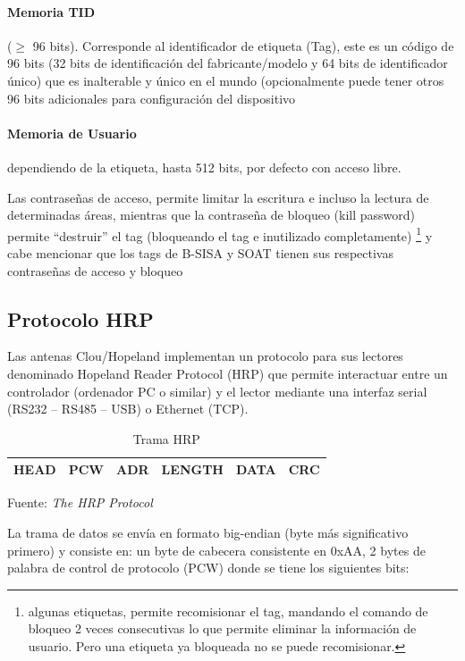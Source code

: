 \documentclass[fleqn,10pt]{SelfArx} %
\begin{document}
\paragraph{Memoria TID} ($\ge$ 96 bits). Corresponde al identificador de etiqueta (Tag), este es un código de 96 bits (32 bits de identificación del fabricante/modelo y 64 bits de identificador único) que es inalterable y único en el mundo (opcionalmente puede tener otros 96 bits adicionales para configuración del dispositivo
\paragraph{Memoria de Usuario} dependiendo de la etiqueta, hasta 512 bits, por defecto con acceso libre.

Las contraseñas de acceso, permite limitar la escritura e incluso la lectura de determinadas áreas, mientras que la contraseña de bloqueo (kill password) permite “destruir” el tag (bloqueando el tag e inutilizado completamente) \footnote{algunas etiquetas, permite recomisionar el tag, mandando el comando de bloqueo 2 veces consecutivas lo que permite eliminar la información de usuario. Pero una etiqueta ya bloqueada no se puede recomisionar.} y cabe mencionar que los tags de B-SISA y SOAT tienen sus respectivas contraseñas de acceso y bloqueo

\subsection*{Protocolo HRP}

Las antenas Clou/Hopeland implementan un protocolo para sus lectores denominado Hopeland Reader Protocol (HRP) que permite interactuar entre un controlador (ordenador PC o similar) y el lector mediante una interfaz serial (RS232 – RS485 – USB) o Ethernet (TCP).

\begin{table}[hbt]
\caption{Trama HRP}
\centering
\begin{tabular}{|l|l|l|l|l|l|}
\hline HEAD & PCW & ADR & LENGTH & DATA & CRC \\ \hline
\end{tabular}
\newline Fuente: \emph{The HRP Protocol} \cite{Hopeland:2016}
\label{tab:hrp_frame}
\end{table}

La trama de datos  se envía en formato big-endian (byte más significativo primero) y consiste en: un byte de cabecera consistente en 0xAA, 2 bytes de palabra de control de protocolo (PCW) donde se tiene los siguientes bits:
\end{document}
